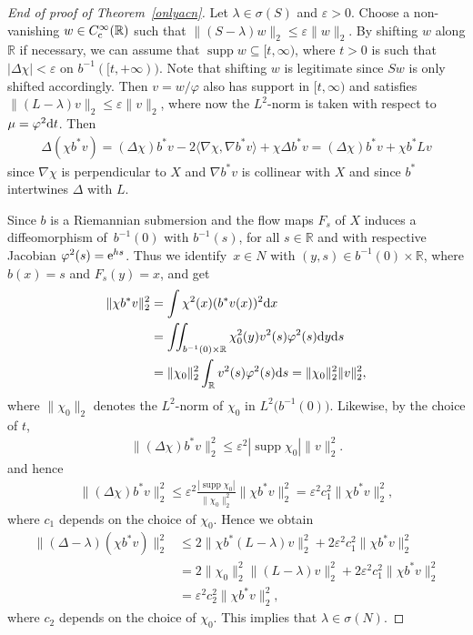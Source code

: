 \documentclass[pdftex]{sigma}
\numberwithin{equation}{section}
\DeclareMathOperator{\supp}{supp}
\def\R{\mathbb R}
\def\ve{\varepsilon}
\def\vf{\varphi}
\begin{document}
\begin{proof}[End of proof of Theorem~\ref{onlyacn}]
Let $\lambda\in\sigma(S)$ and $\ve>0$.
Choose a non-vanishing $w\in C^\infty_{\rm c}(\R)$ such that $\|(S-\lambda)w\|_2\le\ve\|w\|_2$.
By shifting $w$ along $\R$ if necessary, we can assume that $\supp w\subseteq[t,\infty)$,
where $t>0$ is such that $|\Delta\chi| < \ve$ on $b^{-1}([t,+\infty))$.
Note that shifting $w$ is legitimate since $Sw$ is only shifted accordingly.
Then $v=w/\vf$ also has support in $[t,\infty)$ and satisfies $\|(L-\lambda)v\|_2\le\ve\|v\|_2$,
where now the $L^2$-norm is taken with respect to $\mu=\vf^2{\rm d}t$.
Then
\begin{align*}
	\Delta(\chi b^*v)
	= (\Delta\chi)b^*v - 2\langle\nabla\chi,\nabla b^*v\rangle + \chi\Delta b^*v
	= (\Delta\chi)b^*v + \chi b^*Lv
\end{align*}
since $\nabla\chi$ is perpendicular to $X$ and $\nabla b^*v$ is collinear with $X$
and since $b^*$ intertwines $\Delta$ with $L$.

Since $b$ is a Riemannian submersion and the flow maps $F_s$ of $X$ induces
a diffeomorphism of~$b^{-1}(0)$ with $b^{-1}(s)$,
for all $s\in\R$ and with respective Jacobian $\vf^2(s)={\rm e}^{hs}$.
Thus we identify~$x\in N$ with $(y,s)\in b^{-1}(0)\times\R$, where $b(x)=s$ and $F_s(y)=x$,
and get
\begin{align*}%
	\|\chi b^*v\|_2^2
	&= \int \chi^2(x)(b^*v(x))^2{\rm d}x \\
	&= \iint_{b^{-1}(0)\times\R}\chi_0^2(y)v^2(s)\vf^2(s){\rm d}y{\rm d}s \\
	&= \|\chi_0\|_2^2 \int_\R v^2(s)\vf^2(s){\rm d}s
	= \|\chi_0\|_2^2 \|v\|_2^2,
\end{align*}
where $\|\chi_0\|_2$ denotes the $L^2$-norm of $\chi_0$ in $L^2\bigl(b^{-1}(0)\bigr)$.
Likewise, by the choice of $t$,
\begin{align*}%
	\|(\Delta\chi)b^*v\|_2^2
	\le \ve^2|\supp\chi_0| \|v\|_2^2.
\end{align*}
and hence
\begin{align*}%
	\|(\Delta\chi)b^*v\|_2^2
	\le \ve^2\frac{|\supp\chi_0|}{ \|\chi_0\|_2^2}\|\chi b^*v\|_2^2
	= \ve^2c_1^2\|\chi b^*v\|_2^2,
\end{align*}
where $c_1$ depends on the choice of $\chi_0$.
Hence we obtain
\begin{align*}%
	\|(\Delta-\lambda)(\chi b^*v)\|_2^2
	&\le 2\|\chi b^*(L-\lambda)v\|_2^2 + 2\ve^2c_1^2\|\chi b^*v\|_2^2 \\
	&= 2\|\chi_0\|_2^2 \|(L-\lambda)v\|_2^2 + 2\ve^2c_1^2\|\chi b^*v\|_2^2 \\
	&= \ve^2c_2^2\|\chi b^*v\|_2^2,
\end{align*}
where $c_2$ depends on the choice of $\chi_0$.
This implies that $\lambda\in\sigma(N)$.
\end{proof}
\end{document}
